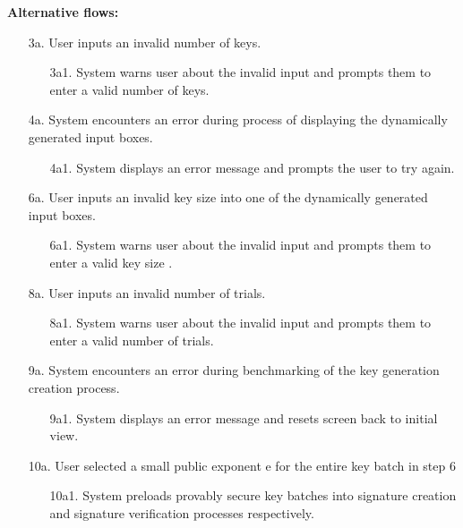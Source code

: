 \documentclass[]{final_report}
\theoremstyle{definition}
\begin{document}
\noindent\textbf{Alternative flows:}
\begin{enumerate}
    \item[3a.] User inputs an invalid number of keys.
    \begin{enumerate}
        \item[3a1.] System warns user about the invalid input and prompts them to enter a valid number of keys.
    \end{enumerate}
        \item[4a.] System encounters an error during process of displaying the dynamically generated input boxes.
    \begin{enumerate}
        \item[4a1.] System displays an error message and prompts the user to try again.
    \end{enumerate}
    \item[6a.] User inputs an invalid key size into one of the dynamically generated input boxes.
    \begin{enumerate}
        \item[6a1.] System warns user about the invalid input and prompts them to enter a valid key size .
    \end{enumerate}
     \item[8a.] User inputs an invalid number of trials.
    \begin{enumerate}
        \item[8a1.] System warns user about the invalid input and prompts them to enter a valid number of trials.
    \end{enumerate}
        \item[9a.] System encounters an error during benchmarking of the key generation creation process.
    \begin{enumerate}
        \item[9a1.] System displays an error message and resets screen back to initial view.
    \end{enumerate}  
        \item[10a.]  User selected a small public exponent e for the entire key batch in step 6
    \begin{enumerate}
        \item[10a1.] System preloads provably secure key batches into signature creation and signature verification processes respectively.
    \end{enumerate}
\end{enumerate}
\end{document}
